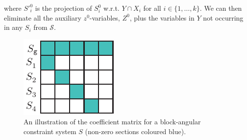 where $S'^0_i$ is the projection of $S^0_i$ w.r.t. $Y\cap X_i$ for all $i\in\{1,\ldots, k\}$.
We can then eliminate all the auxiliary $z^0$-variables, $Z^0$, plus the variables in $Y$ not occurring in any $S_i$ from $\mathcal{S}$. 
\begin{figure}[htbp]
	\centering
		\includegraphics{figures/blockStructure.pdf}
	\caption{An illustration of the coefficient matrix for a block-angular constraint system $S$ (non-zero sections coloured blue).}
	\label{fig:decomp}
\end{figure}

